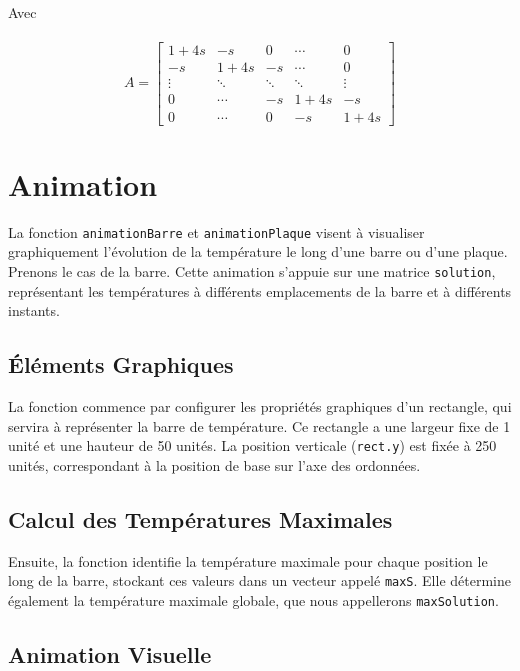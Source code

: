 \documentclass{article}
\begin{document}
\\ \\ Avec \\ \\
\[
A = \begin{bmatrix}
    1+4s & -s & 0 & \cdots & 0 \\
    -s & 1+4s & -s & \cdots & 0 \\
    \vdots & \ddots & \ddots & \ddots & \vdots \\
    0 & \cdots & -s & 1+4s & -s \\
    0 & \cdots & 0 & -s & 1+4s
\end{bmatrix}
\]
\newpage
\section{Animation}

La fonction \texttt{animationBarre} et  \texttt{animationPlaque} visent à visualiser graphiquement l'évolution de la température le long d'une barre ou d'une plaque. Prenons le cas de la barre. Cette animation s'appuie sur une matrice \texttt{solution}, représentant les températures à différents emplacements de la barre et à différents instants.

\subsection{Éléments Graphiques}

La fonction commence par configurer les propriétés graphiques d'un rectangle, qui servira à représenter la barre de température. Ce rectangle a une largeur fixe de 1 unité et une hauteur de 50 unités. La position verticale (\texttt{rect.y}) est fixée à 250 unités, correspondant à la position de base sur l'axe des ordonnées.

\subsection{Calcul des Températures Maximales}

Ensuite, la fonction identifie la température maximale pour chaque position le long de la barre, stockant ces valeurs dans un vecteur appelé \texttt{maxS}. Elle détermine également la température maximale globale, que nous appellerons \texttt{maxSolution}.

\subsection{Animation Visuelle}
\end{document}
